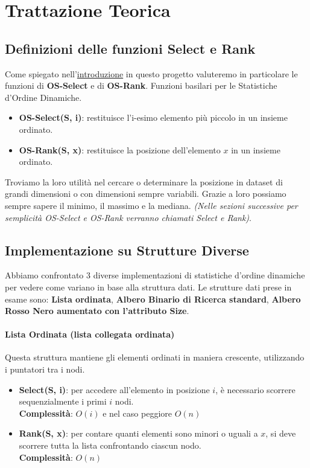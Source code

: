 \documentclass[10pt]{article}
\begin{document}
\section{Trattazione Teorica}
\subsection{Definizioni delle funzioni Select e Rank}
Come spiegato nell'\hyperref[introduzione]{introduzione} in questo progetto valuteremo in particolare le funzioni di \textbf{OS-Select} e di \textbf{OS-Rank}. Funzioni basilari per le Statistiche d'Ordine Dinamiche.
\begin{itemize}
\item \textbf{OS-Select(S, i)}: restituisce l’i-esimo elemento più piccolo in un insieme ordinato.
\item \textbf{OS-Rank(S, x)}: restituisce la posizione dell'elemento $x$ in un insieme ordinato.    
\end{itemize}
Troviamo la loro utilità nel cercare o determinare la posizione in dataset di grandi dimensioni o con  dimensioni sempre variabili. Grazie a loro possiamo sempre sapere il minimo, il massimo e la mediana. \textit{(Nelle sezioni successive per semplicità OS-Select e OS-Rank verranno chiamati Select e Rank)}.

\subsection{Implementazione su Strutture Diverse}
Abbiamo confrontato 3 diverse implementazioni di statistiche d'ordine dinamiche per vedere come variano in base alla struttura dati. Le strutture dati prese in esame sono: \textbf{Lista ordinata}, \textbf{Albero Binario di Ricerca standard}, \textbf{Albero Rosso Nero aumentato con l'attributo Size}.
\paragraph{Lista Ordinata (lista collegata ordinata)}
Questa struttura mantiene gli elementi ordinati in maniera crescente, utilizzando i puntatori tra i nodi.

\begin{itemize}
    \item \textbf{Select(S, i)}: per accedere all’elemento in posizione $i$, è necessario scorrere sequenzialmente i primi $i$ nodi. \\
    \textbf{Complessità}: $O(i)$ e nel caso peggiore $O(n)$
    
    \item \textbf{Rank(S, x)}: per contare quanti elementi sono minori o uguali a $x$, si deve scorrere tutta la lista confrontando ciascun nodo. \\
    \textbf{Complessità}: $O(n)$
\end{itemize}
\end{document}
